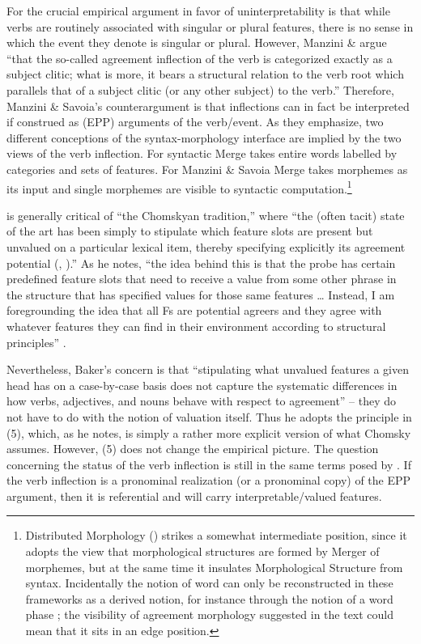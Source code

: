 \documentclass[output=paper]{langsci/langscibook}
\begin{document}
For \citet{Chomsky1995} the crucial empirical argument in favor of uninterpretability is that while verbs are routinely associated with singular or plural features, there is no sense in which the event they denote is singular or plural. However, Manzini \& \citet[21]{Savoia2007} argue “that the so-called agreement inflection of the verb is categorized exactly as a subject clitic; what is more, it bears a structural relation to the verb root which parallels that of a subject clitic (or any other subject) to the verb.” Therefore, Manzini \& Savoia’s counterargument is that inflections can in fact be interpreted if construed as (EPP) arguments of the verb/event. As they emphasize, two different conceptions of the syntax-morphology interface are implied by the two views of the verb inflection. For \citet{Chomsky1995} syntactic Merge takes entire words labelled by categories and sets of features. For Manzini \& Savoia Merge takes morphemes as its input and single morphemes are visible to syntactic computation.\footnote{Distributed Morphology (\citealt{Halle1993}) strikes a somewhat intermediate position, since it adopts the view that morphological structures are formed by Merger of morphemes, but at the same time it insulates Morphological Structure from syntax. Incidentally the notion of word can only be reconstructed in these frameworks as a derived notion, for instance through the notion of a word phase \citep{Marantz2007}; the visibility of agreement morphology suggested in the text could mean that it sits in an edge position.} 

\citet[4]{Baker2008} is generally critical of “the Chomskyan tradition,” where “the (often tacit) state of the art has been simply to stipulate which feature slots are present but unvalued on a particular lexical item, thereby specifying explicitly its agreement potential (\citealt{Chomsky2000}, \citealt{Chomsky2001}).” As he notes, “the idea behind this is that the probe has certain predefined feature slots that need to receive a value from some other phrase in the structure that has specified values for those same features … Instead, I am foregrounding the idea that all Fs are potential agreers and they agree with whatever features they can find in their environment according to structural principles” \citep[44]{Baker2008}.{}  

Nevertheless, Baker’s concern is that “stipulating what unvalued features a given head has on a case-by-case basis does not capture the systematic differences in how verbs, adjectives, and nouns behave with respect to agreement” – they do not have to do with the notion of valuation itself. Thus he adopts the principle in (5), which, as he notes, is simply a rather more explicit version of what Chomsky assumes. However, (5) does not change the empirical picture. The question concerning the status of the verb inflection is still in the same terms posed by \citet{Manzini2007}. If the verb inflection is a pronominal realization (or a pronominal copy) of the EPP argument, then it is referential and will carry interpretable/valued features.
\end{document}
